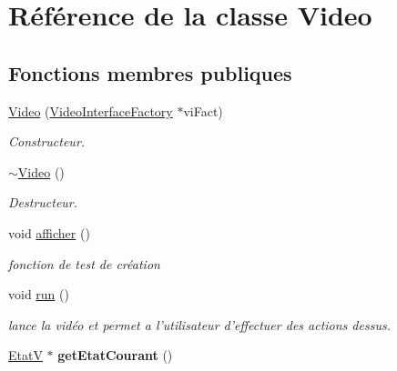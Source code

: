 \hypertarget{classVideo}{\section{Référence de la classe Video}
\label{classVideo}
}
\subsection*{Fonctions membres publiques}
\begin{DoxyCompactItemize}
\item 
\hyperlink{classVideo_a54f940a5f19f6bf69ea67fdf62ec8b9c}{Video} (\hyperlink{classVideoInterfaceFactory}{Video\+Interface\+Factory} $\ast$vi\+Fact)
\begin{DoxyCompactList}\small\item\em Constructeur. \end{DoxyCompactList}\item 
\hypertarget{classVideo_aebf7e2a8fa2bbd79335b1cf35925d190}{\hyperlink{classVideo_aebf7e2a8fa2bbd79335b1cf35925d190}{$\sim$\+Video} ()}\label{classVideo_aebf7e2a8fa2bbd79335b1cf35925d190}

\begin{DoxyCompactList}\small\item\em Destructeur. \end{DoxyCompactList}\item 
\hypertarget{classVideo_a787b7cb0faa1c1879b8709247c1efff9}{void \hyperlink{classVideo_a787b7cb0faa1c1879b8709247c1efff9}{afficher} ()}\label{classVideo_a787b7cb0faa1c1879b8709247c1efff9}

\begin{DoxyCompactList}\small\item\em fonction de test de création \end{DoxyCompactList}\item 
\hypertarget{classVideo_a88d85260aae83f3a57c5ead9eda23b6b}{void \hyperlink{classVideo_a88d85260aae83f3a57c5ead9eda23b6b}{run} ()}\label{classVideo_a88d85260aae83f3a57c5ead9eda23b6b}

\begin{DoxyCompactList}\small\item\em lance la vidéo et permet a l'utilisateur d'effectuer des actions dessus. \end{DoxyCompactList}\item 
\hypertarget{classVideo_a5255a0a2f36b0152e9065743a54fadec}{\hyperlink{classEtatV}{Etat\+V} $\ast$ {\bfseries get\+Etat\+Courant} ()}\label{classVideo_a5255a0a2f36b0152e9065743a54fadec}


\end{DoxyCompactItemize}
